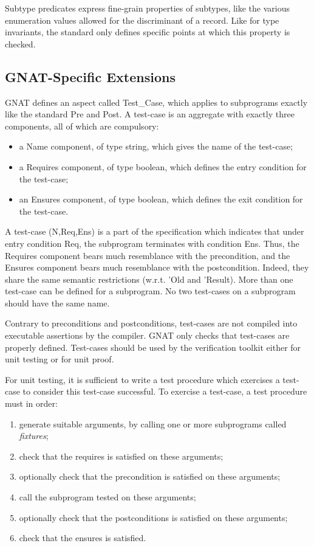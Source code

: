 \documentclass[fullpage]{article}
\begin{document}
Subtype predicates express fine-grain properties of subtypes, like the various
enumeration values allowed for the discriminant of a record. Like for type
invariants, the standard only defines specific points at which this property is
checked.

\subsection{GNAT-Specific Extensions}

GNAT defines an aspect called Test\_Case, which applies to subprograms exactly
like the standard Pre and Post. A test-case is an aggregate with exactly three
components, all of which are compulsory:
\begin{itemize}
\item a Name component, of type string, which gives the name of the test-case;
\item a Requires component, of type boolean, which defines the entry condition
  for the test-case;
\item an Ensures component, of type boolean, which defines the exit condition
  for the test-case.
\end{itemize}

A test-case (N,Req,Ens) is a part of the specification which indicates that
under entry condition Req, the subprogram terminates with condition Ens. Thus,
the Requires component bears much resemblance with the precondition, and the
Ensures component bears much resemblance with the postcondition. Indeed, they
share the same semantic restrictions (w.r.t. 'Old and 'Result).  More than one
test-case can be defined for a subprogram. No two test-cases on a subprogram
should have the same name.

Contrary to preconditions and postconditions, test-cases are not compiled into
executable assertions by the compiler. GNAT only checks that test-cases are
properly defined. Test-cases should be used by the verification toolkit either
for unit testing or for unit proof.

For unit testing, it is sufficient to write a test procedure which exercises a
test-case to consider this test-case successful. To exercise a test-case, a
test procedure must in order:
\begin{enumerate}
\item generate suitable arguments, by calling one or more subprograms
  called \textit{fixtures};
\item check that the requires is satisfied on these arguments;
\item optionally check that the precondition is satisfied on these arguments;
\item call the subprogram tested on these arguments;
\item optionally check that the postconditions is satisfied on these arguments;
\item check that the ensures is satisfied.
\end{enumerate}
\end{document}
